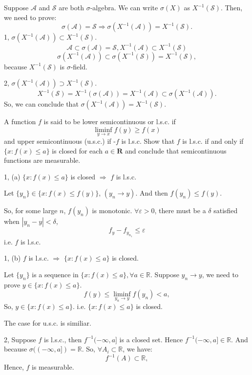 \documentclass[en, normal, 11pt, black]{elegantnote}
\newenvironment{exercise}[1]{\begin{tcolorbox}[colback=black!15, colframe=black!80, breakable, title=#1]}{\end{tcolorbox}}
\renewenvironment{proof}{\begin{tcolorbox}[colback=white, colframe=black!50, breakable, title=Proof. ]\setlength{\parskip}{0.8em}}{\\\rightline{$\square$}\end{tcolorbox}}
\newenvironment{solution}{\begin{tcolorbox}[colback=white, colframe=black!50, breakable, title=Solution. ]\setlength{\parskip}{0.8em}}{\end{tcolorbox}}
\begin{document}
    \begin{proof}
        Suppose $\mathcal{A}$ and $\mathcal{S}$ are both $\sigma$-algebra. 
        We can write $\sigma(X)$ as $X^{-1}(\mathcal{S})$. Then, we need to prove: 
        \[\sigma(\mathcal{A})=\mathcal{S}\Rightarrow \sigma(X^{-1}(\mathcal{A}))=X^{-1}(\mathcal{S}). \]
        1, $\sigma(X^{-1}(\mathcal{A}))\subset X^{-1}(\mathcal{S})$. 
        \[\mathcal{A}\subset\sigma(\mathcal{A})=\mathcal{S}, X^{-1}(\mathcal{A})\subset X^{-1}(\mathcal{S})\]
        \[\sigma(X^{-1}(\mathcal{A}))\subset \sigma(X^{-1}(\mathcal{S}))=X^{-1}(\mathcal{S}), \]
        because $X^{-1}(\mathcal{S})$ is $\sigma$-field. 

        2, $\sigma(X^{-1}(\mathcal{A}))\supset X^{-1}(\mathcal{S})$. 
        \[X^{-1}(\mathcal{S})=X^{-1}(\sigma(\mathcal{A}))=X^{-1}(\mathcal{A})\subset\sigma(X^{-1}(\mathcal{A})). \]
        So, we can conclude that $\sigma(X^{-1}(\mathcal{A}))=X^{-1}(\mathcal{S})$. 
    \end{proof}

    \begin{exercise}{1.3.5}
        A function $f$ is said to be lower semicontinuous or l.s.c. if
        $$
        \liminf _{y \rightarrow x} f(y) \geq f(x)
        $$
        and upper semicontinuous (u.s.c.) if -$f$ is l.s.c. Show that $f$ is l.s.c. if and only if $\{x: f(x) \leq a\}$ is closed for each $a \in \mathbf{R}$ and conclude that semicontinuous functions are measurable.
    \end{exercise}

    \begin{solution}
        1, (a) $\{x: f(x) \leq a\}$ is closed $\Rightarrow$ $f$ is l.s.c. 

        Let $\{y_n\}\in\{x:f(x)\leqslant f(y)\}$, $(y_n \to y)$. And then $f(y_n)\leqslant f(y)$. 

        So, for some large $n$, $f(y_n)$ is monotonic. $\forall \varepsilon>0$, there must be a $\delta$ satisfied when $|y_{n}-y|<\delta$, 
        \[f_y-f_{y_{n_1}}\leqslant \varepsilon\]
        i.e. $f$ is l.s.c. 

        1, (b) $f$ is l.s.c. $\Rightarrow$ $\{x: f(x) \leq a\}$ is closed. 

        Let $\{y_n\}$ is a sequence in $\{x:f(x)\leqslant a\}, \forall a\in\mathbb{R}$. Suppose $y_n\to y$, we need to prove $y\in\{x:f(x)\leqslant a\}$. 
        \[f(y)\leqslant\liminf_{y_n\to y}f(y_n)<a, \]
        So, $y\in\{x:f(x)\leqslant a\}$. i.e. $\{x: f(x) \leq a\}$ is closed. 
        
        The case for u.s.c. is similiar. 

        2, Suppose $f$ is l.s.c., then $f^{-1}(-\infty, a]$ is a closed set. Hence $f^{-1}(-\infty, a]\in\mathbb{R}$. And because $\sigma((-\infty,a])=\mathbb{R}$. So, $\forall A_i \subset \mathbb{R}$, we have: 
        \[f^{-1}(A)\subset\mathbb{R}, \]
        Hence, $f$ is measurable. 
    \end{solution}
    
\end{document}
